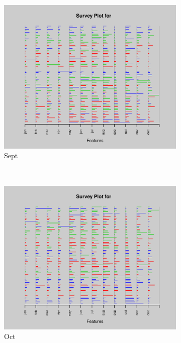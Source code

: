 \documentclass{article}
\begin{document}
\begin{enumerate}[leftmargin = 0 em, label = \arabic*., font = \bfseries]
\begin{enumerate}
\begin{enumerate}
\begin{figure}[!htb]
\begin{subfigure}[b]{0.3\textwidth}
        	\includegraphics[width = \textwidth]{3cii9.eps}
        	\caption{Sept}
        	\end{subfigure}\\
        	\begin{subfigure}[b]{0.3\textwidth}
        	\includegraphics[width = \textwidth]{3cii10.eps}
        	\caption{Oct}
        	\end{subfigure}%
        	\begin{subfigure}[b]{0.3\textwidth}

\end{subfigure}
\end{figure}
\end{enumerate}
\end{enumerate}
\end{enumerate}
\end{document}
